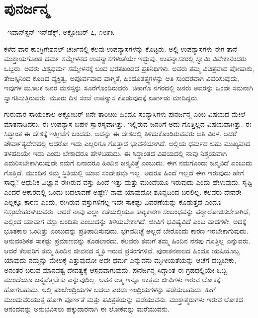 \section*{ಪುನರ್ಜನ್ಮ }

~\hfill{\fontsize{11pt}{13.75pt}\selectfont ಇವಾನ್‍ಸ್ಟನ್ ಇನ್‍ಡೆಕ್ಸ್, ಅಕ್ಟೋಬರ್ ೭, ೧೮೯೩}

ಕಳೆದ ವಾರ ಕಾಂಗ್ರಿಗೇಶನಲ್ ಚರ್ಚಿನಲ್ಲಿ ಕೆಲವು ಉಪನ್ಯಾಸಗಳನ್ನು ಕೊಟ್ಟರು. ಅಲ್ಲಿ ಉಪನ್ಯಾಸಗಳು ಈಗ ತಾನೆ ಮುಕ್ತಾಯಗೊಂಡ ಧರ್ಮ ಸಮ್ಮೇಳನದ ಉಪನ್ಯಾಸಗಳಂತೆಯೇ ಇದ್ದುವು. ಉಪನ್ಯಾಸಕರಲ್ಲಿ ಸ್ವಾಮಿ ವಿವೇಕಾನಂದರು ಒಬ್ಬರು. ಅವರು ವಿಶ್ವಧರ್ಮ ಸಮ್ಮೇಳನಕ್ಕೆ ಬಂದ ಭರತಖಂಡದ ಪ್ರತಿನಿಧಿಗಳು. ಅವರು ತಮ್ಮ ವಿಚಿತ್ರವಾದ ಪೋಷಾಕು, ತೇಜಸ್ಸಿನಿಂದ ಕೂಡಿದ ವ್ಯಕ್ತಿತ್ವ, ಅಪೂರ್ವವಾದ ವಾಗ್ಮಿತೆ, ಹಿಂದೂತತ್ತ್ವಗಳನ್ನು ಅತಿ ಸುಂದರವಾಗಿ ವಿವರಿಸುವುದು, ಇವುಗಳ ಮೂಲಕ ಜನರ ಮನಸ್ಸನ್ನು ಸೂರೆಗೊಂಡಿರುವರು. ಚಿಕಾಗೊ ನಗರದಲ್ಲಿ ಜನರು ಅವರನ್ನು ಒಂದೇ ಸಮನಾಗಿ ಸ್ವಾಗತಿಸುತ್ತಿರುವರು. ಮೂರು ದಿನ ಸಂಜೆ ಉಪನ್ಯಾಸ ಕೊಡುವುದಕ್ಕೆ ಏರ್ಪಾಡು ಮಾಡಿದ್ದರು. 

 ಗುರುವಾರ ಸಾಯಂಕಾಲ ಅಕ್ಟೋಬರ್ ೫ನೇ ತಾರೀಖು ಹಿಂದೂ ಸಂನ್ಯಾಸಿಗಳು ಪುನರ್ಜನ್ಮ ಎಂಬ ವಿಷಯದ ಮೇಲೆ ಮಾತನಾಡಿದರು. ಈ ಉಪನ್ಯಾಸ ಬಹಳ ಸ್ವಾರಸ್ಯವಾಗಿತ್ತು. ಇಲ್ಲಿರುವ ಜನರಿಗೆ ಅದು ಗೊತ್ತಿಲ್ಲದ ವಿಷಯವಾಗಿತ್ತು. ಈ ಸಿದ್ಧಾಂತ ಈ ದೇಶಕ್ಕೆ ಇತ್ತೀಚೆಗೆ ಬಂದದು. ಅದನ್ನು ಈ ದೇಶದಲ್ಲಿ ತಿಳಿದುಕೊಂಡಿರುವವರು ಅತಿ ವಿರಳ. ಆದರೆ ಪೌರ್ವಾತ್ಯದೇಶದಲ್ಲಿ ಆದರೋ ಇದು ಎಲ್ಲರಿಗೂ ಗೊತ್ತಾದ ಭಾವನೆಯಾಗಿದೆ. ಅಲ್ಲಿಯ ಧರ್ಮದ ಬಹು ಮುಖ್ಯವಾದ ತಳಹದಿಯೇ ಇದು ಎಂದು ಬೇಕಾದರೂ ಹೇಳಬಹುದು. ಈ ಸಿದ್ಧಾಂತದ ವಿಷಯದಲ್ಲಿ ನಾವು ನಿಶ್ಚಯವಾಗಿ ಎದುರಿಸಬೇಕಾಗಿರುವುದೇ ನಮಗೆ ಏನಾದರೂ ಹಿಂದಿನ ಜನ್ಮವಿತ್ತೆ ಎಂಬುದು. ಈಗ ನಮಗೊಂದು ಜನ್ಮವಿದೆ ಎಂಬುದು ಗೊತ್ತಿದೆ. ಮುಂದಿನ ನಮ್ಮ ಸ್ಥಿತಿಯಲ್ಲಿ ಯಾವ ಸಂದೇಹವೂ ಇಲ್ಲ. ಆದರೂ ಹಿಂದೆ ಇಲ್ಲದೆ ಈಗ ಇರುವುದು ಹೇಗೆ ಸಾಧ್ಯ? ಆಧುನಿಕ ವಿಜ್ಞಾನ ಈಗಿರುವ ವಸ್ತು ಹಿಂದೆ ಇತ್ತು ಮತ್ತು ಮುಂದೆಯೂ ಇರುವುದು ಎಂದು ಹೇಳುವುದು. ಸೃಷ್ಟಿ ಎಂದರೆ ಆಕಾರದಲ್ಲಿ ಒಂದು ಬದಲಾವಣೆ ಅಷ್ಟೇ? ನಾವು ಯಾವುದೋ ಶೂನ್ಯದಿಂದ ಬರಲಿಲ್ಲ. ಕೆಲವರು ದೇವರೇ ಎಲ್ಲಕ್ಕೂ ಕಾರಣ ಎಂದು, ಈಗಿರುವ ವಸ್ತುಗಳಿಗೆಲ್ಲ ಇದೇ ಸಾಕಷ್ಟು ವಿವರಣೆಯನ್ನು ಕೊಡುತ್ತದೆ ಎಂದೂ ನಿಸ್ಸಂದೇಹರಾಗಿರುವರು. ಆದರೆ ನಾವು ಎಲ್ಲಾ ಕಡೆಯಲ್ಲಿಯೂ ಕಾರ‍್ಯಕಾರಣ ಸಂಬಂಧವನ್ನು ಪರ‍್ಯಾಲೋಚಿಸಬೇಕಾಗಿದೆ, ಎಲ್ಲಿಂದ ಯಾವಾಗ ವಸ್ತು ಬಂದಿತು ಎಂಬುದನ್ನು ತಿಳಿಯಬೇಕಾಗಿದೆ. ಜೀವಿಗೆ ಭವಿಷ್ಯವಿದೆ ಎಂಬ ವಾದಗಳೇ, ಅದಕ್ಕೆ ಭೂತಕಾಲ ಒಂದಿತ್ತು ಎಂಬುದನ್ನು ಪ್ರತಿಪಾದಿಸುವುದು. ಭಗವದಿಚ್ಛೆ ಅಲ್ಲದೆ ಬೇರೊಂದು ಕಾರಣ ಇರಬೇಕಾಗುವುದು. ಆನುವಂಶಿಕತೆ ಸಾಕಷ್ಟು ಪ್ರಮಾಣವನ್ನು ಕೊಡಲಾರದು. ಕೆಲವರು ತಮಗೆ ತಮ್ಮ ಹಿಂದಿನ ನೆನಪು ಗೊತ್ತಿಲ್ಲ ಎನ್ನುವರು. ಆದರೆ ಕೆಲವರಿಗೆ ತಮ್ಮ ಹಿಂದಿನ ಜೀವನದ ಸ್ಮೃತಿ ಇರುವ ಪ್ರಸಂಗಗಳಿವೆ. ಪುರಾತನಕಾಲದ ಹಿಂದೂ ಋಷಿಯೊಬ್ಬ ಯಾವುದು ನಮ್ಮನ್ನು ಮೇಲಕ್ಕೆ ಎತ್ತುವುದೋ ಅದೇ ಧರ್ಮ ಎನ್ನುವನು ಮೃಗೀಯತೆಯನ್ನು ಆಚೆಗೆ ದಬ್ಬಬೇಕು, ಅನಂತರ ಬರುವ ಮಾನವತ್ವ ದೇವತ್ವಕ್ಕೆ ಆಸ್ಪದವಾಗುವುದು. ಪುನರ್ಜನ್ಮ ಸಿದ್ಧಾಂತ ಈ ಗ್ರಹದಲ್ಲಿಯೇ ಒಬ್ಬ ಮುಂದೆಯೂ ಜನ್ಮವೆತ್ತಬೇಕು ಎನ್ನುವುದಿಲ್ಲ. ಅವನ ಆತ್ಮ ಇನ್ನೂ ಉತ್ತಮ ಜೀವಿಗಳು ಇರುವ ಲೋಕಕ್ಕೆ ಹೋಗಬಹುದು. ಅಲ್ಲಿ ಪಂಚೇಂದ್ರಿಯಗಳ ಬದಲು ಎರಡು ಇಂದ್ರಿಯಗಳನ್ನು ಪಡೆಯಬಹುದು. ಹೀಗೆ ಮುಂದುವರಿಯುತ್ತ ಹೋಗಿ ಪೂರ್ಣತೆ ಮತ್ತು ಪವಿತ್ರತೆಯನ್ನು ಪಡೆಯುವನು. ಮುಕ್ತಾತ್ಮರುಗಳು ಇರುವ ಲೋಕದ ಆನಂದವನ್ನು ಅನುಭವಿಸಲು ಹಕ್ಕುದಾರನಾಗಿ ಈ ಲೋಕವನ್ನು ಮರೆಯುವನು.


